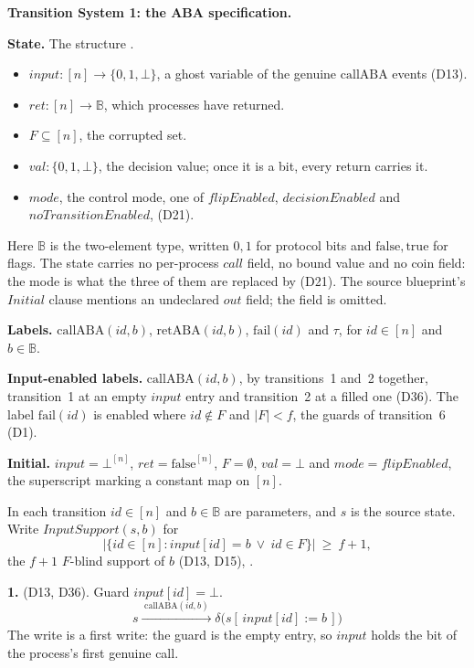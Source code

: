 \noindent\textbf{Transition System 1: the ABA specification.}

\medskip \noindent\textbf{State.} The structure .
\begin{itemize}
  \item $input : [n] \to \{0,1,\bot\}$, a ghost variable of the genuine $\mathrm{callABA}$ events (D13).
  \item $ret : [n] \to \mathbb{B}$, which processes have returned.
  \item $F \subseteq [n]$, the corrupted set.
  \item $val : \{0,1,\bot\}$, the decision value; once it is a bit, every return carries it.
  \item $mode$, the control mode, one of $flipEnabled$, $decisionEnabled$ and $noTransitionEnabled$,  (D21).
\end{itemize}
\noindent Here $\mathbb{B}$ is the two-element type, written $0,1$ for protocol bits and $\mathrm{false},\mathrm{true}$ for flags.
The state carries no per-process $call$ field, no bound value and no coin field: the mode is what the three of them are replaced by (D21).
The source blueprint's $Initial$ clause mentions an undeclared $out$ field; the field is omitted.

\noindent\textbf{Labels.} $\mathrm{callABA}(id,b)$, $\mathrm{retABA}(id,b)$, $\mathrm{fail}(id)$ and $\tau$, for $id \in [n]$ and $b \in \mathbb{B}$.

\noindent\textbf{Input-enabled labels.} $\mathrm{callABA}(id,b)$, by transitions~1 and~2 together, transition~1 at an empty $input$ entry and transition~2 at a filled one (D36).
The label $\mathrm{fail}(id)$ is enabled where $id \notin F$ and $|F| < f$, the guards of transition~6 (D1).

\noindent\textbf{Initial.} $input = \bot^{[n]}$, $ret = \mathrm{false}^{[n]}$, $F = \emptyset$, $val = \bot$ and $mode = flipEnabled$, the superscript marking a constant map on $[n]$.

\medskip \noindent In each transition $id \in [n]$ and $b \in \mathbb{B}$ are parameters, and $s$ is the source state.
Write $InputSupport(s,b)$ for
\[ \bigl|\{ id \in [n] : input[id] = b \ \vee\ id \in F \}\bigr| \ \geq\ f + 1 , \]
the $f{+}1$ $F$-blind support of $b$ (D13, D15), .

\medskip
\noindent\textbf{1.}  (D13, D36).
Guard $input[id] = \bot$.
\[ s \xrightarrow{\;\mathrm{callABA}(id,b)\;}
   \delta\bigl(s[\,input[id] := b\,]\bigr) \]
The write is a first write: the guard is the empty entry, so $input$ holds the bit of the process's first genuine call.

